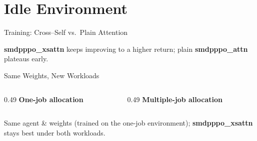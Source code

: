 
\section{Idle Environment}

\begin{frame}{Training: Cross--Self vs.\ Plain Attention}
  \centering

  \vspace{0.2em}
  {\small\textcolor{DeepBlue}{\textbf{smdpppo\_xsattn} keeps improving to a higher return; plain \textbf{smdpppo\_attn} plateaus early.}}
\end{frame}

\begin{frame}{Same Weights, New Workloads}
  \begin{columns}[T,onlytextwidth]
    \begin{column}{0.49\textwidth}
      \centering
      {\bfseries\color{DeepBlue} One-job allocation}\\[3pt]
    \end{column}
    \begin{column}{0.49\textwidth}
      \centering
      {\bfseries\color{DeepBlue} Multiple-job allocation}\\[3pt]
    \end{column}
  \end{columns}

  \vspace{0.3em}
  \centering
  {\small\textcolor{DeepBlue}{Same agent \& weights (trained on the one-job environment); \textbf{smdpppo\_xsattn} stays best under both workloads.}}
\end{frame}

